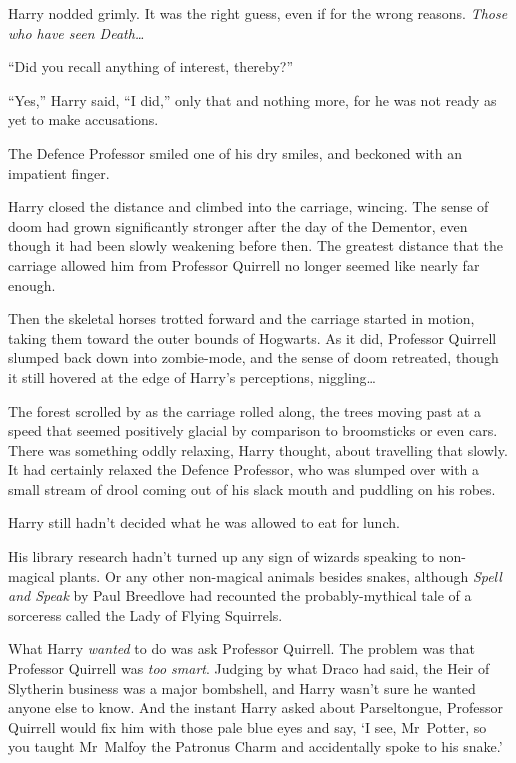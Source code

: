 Harry nodded grimly. It was the right guess, even if for the wrong reasons. \emph{Those who have seen Death…}

“Did you recall anything of interest, thereby?”

“Yes,” Harry said,
“I did,” only that and nothing more, for he was not ready as yet to make accusations.

The Defence Professor smiled one of his dry smiles, and beckoned with an impatient finger.

Harry closed the distance and climbed into the carriage, wincing. The sense of doom had grown significantly stronger after the day of the Dementor, even though it had been slowly weakening before then. The greatest distance that the carriage allowed him from Professor Quirrell no longer seemed like nearly far enough.

Then the skeletal horses trotted forward and the carriage started in motion, taking them toward the outer bounds of Hogwarts. As it did, Professor Quirrell slumped back down into zombie-mode, and the sense of doom retreated, though it still hovered at the edge of Harry’s perceptions, niggling…

The forest scrolled by as the carriage rolled along, the trees moving past at a speed that seemed positively glacial by comparison to broomsticks or even cars. There was something oddly relaxing, Harry thought, about travelling that slowly. It had certainly relaxed the Defence Professor, who was slumped over with a small stream of drool coming out of his slack mouth and puddling on his robes.

Harry still hadn’t decided what he was allowed to eat for lunch.

His library research hadn’t turned up any sign of wizards speaking to non-magical plants. Or any other non-magical animals besides snakes, although \emph{Spell and Speak} by Paul Breedlove had recounted the probably-mythical tale of a sorceress called the Lady of Flying Squirrels.

What Harry \emph{wanted} to do was ask Professor Quirrell. The problem was that Professor Quirrell was \emph{too smart}. Judging by what Draco had said, the Heir of Slytherin business was a major bombshell, and Harry wasn’t sure he wanted anyone else to know. And the instant Harry asked about Parseltongue, Professor Quirrell would fix him with those pale blue eyes and say, ‘I see, Mr~Potter, so you taught Mr~Malfoy the Patronus Charm and accidentally spoke to his snake.’

